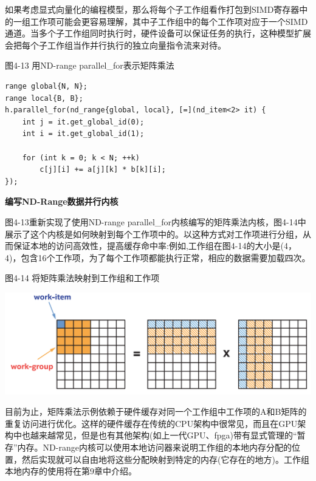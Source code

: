 \begin{tcolorbox}[colback=blue!5!white,colframe=blue!75!black, title=对于子工作组的思考]
如果考虑显式向量化的编程模型，那么将每个子工作组看作打包到SIMD寄存器中的一组工作项可能会更容易理解，其中子工作组中的每个工作项对应于一个SIMD通道。当多个子工作组同时执行时，硬件设备可以保证任务的执行，这种模型扩展会把每个子工作组当作并行执行的独立向量指令流来对待。
\end{tcolorbox}

\hspace*{\fill} \par %
图4-13 用ND-range parallel\_for表示矩阵乘法
\begin{lstlisting}[caption={}]
range global{N, N};
range local{B, B};
h.parallel_for(nd_range{global, local}, [=](nd_item<2> it) {
	int j = it.get_global_id(0);
	int i = it.get_global_id(1);
	
	for (int k = 0; k < N; ++k)
		c[j][i] += a[j][k] * b[k][i];
});
\end{lstlisting}

\hspace*{\fill} \par %
\textbf{编写ND-Range数据并行内核}

图4-13重新实现了使用ND-range parallel\_for内核编写的矩阵乘法内核，图4-14中展示了这个内核是如何映射到每个工作项中的。以这种方式对工作项进行分组，从而保证本地的访问高效性，提高缓存命中率:例如,工作组在图4-14的大小是(4，4)，包含16个工作项，为了每个工作项都能执行正常，相应的数据需要加载四次。\par

\hspace*{\fill} \par %
图4-14 将矩阵乘法映射到工作组和工作项
\begin{center}
	\includegraphics[width=1.\textwidth]{content/chapter-4/images/8}
\end{center}

目前为止，矩阵乘法示例依赖于硬件缓存对同一个工作组中工作项的A和B矩阵的重复访问进行优化。这样的硬件缓存在传统的CPU架构中很常见，而且在GPU架构中也越来越常见，但是也有其他架构(如上一代GPU、fpga)带有显式管理的“暂存”内存。ND-range内核可以使用本地访问器来说明工作组的本地内存分配的位置，然后实现就可以自由地将这些分配映射到特定的内存(它存在的地方)。工作组本地内存的使用将在第9章中介绍。\par

